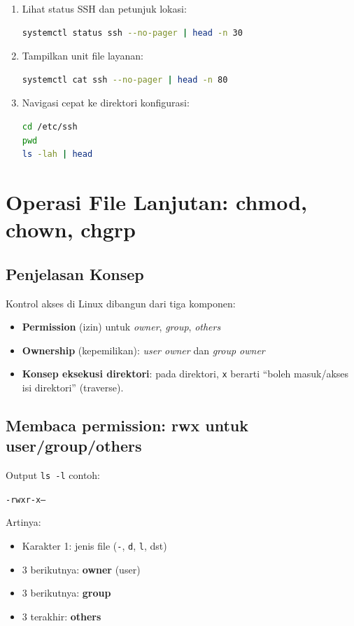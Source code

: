 \begin{enumerate}
    \item Lihat status SSH dan petunjuk lokasi:
\begin{lstlisting}[language=bash, caption={Menelusuri info layanan via systemctl}]
systemctl status ssh --no-pager | head -n 30
\end{lstlisting}

    \item Tampilkan unit file layanan:
\begin{lstlisting}[language=bash, caption={Menemukan unit file layanan}]
systemctl cat ssh --no-pager | head -n 80
\end{lstlisting}

    \item Navigasi cepat ke direktori konfigurasi:
\begin{lstlisting}[language=bash, caption={Navigasi ke direktori konfigurasi SSH}]
cd /etc/ssh
pwd
ls -lah | head
\end{lstlisting}
\end{enumerate}

\section{Operasi File Lanjutan: chmod, chown, chgrp}
\label{sec:perm-owner}

\subsection*{Penjelasan Konsep}
Kontrol akses di Linux dibangun dari tiga komponen:
\begin{itemize}
    \item \textbf{Permission} (izin) untuk \textit{owner}, \textit{group}, \textit{others}
    \item \textbf{Ownership} (kepemilikan): \textit{user owner} dan \textit{group owner}
    \item \textbf{Konsep eksekusi direktori}: pada direktori, \texttt{x} berarti ``boleh masuk/akses isi direktori'' (traverse).
\end{itemize}

\subsection*{Membaca permission: rwx untuk user/group/others}
Output \texttt{ls -l} contoh:
\begin{center}
\texttt{-rwxr-x---}
\end{center}
Artinya:
\begin{itemize}
    \item Karakter 1: jenis file (\texttt{-}, \texttt{d}, \texttt{l}, dst)
    \item 3 berikutnya: \textbf{owner} (user)
    \item 3 berikutnya: \textbf{group}
    \item 3 terakhir: \textbf{others}
\end{itemize}

